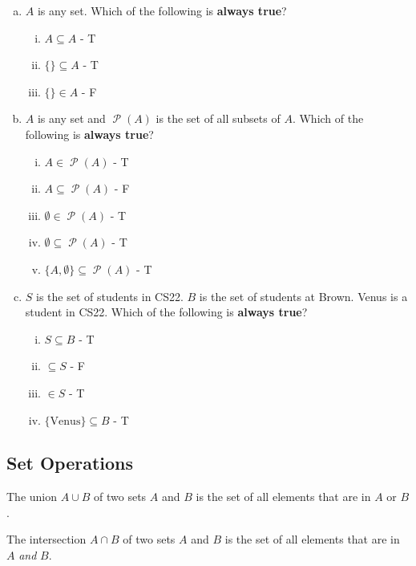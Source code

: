 \documentclass[12pt,letterpaper]{article}
\newcommand\Pow{\ensuremath{\operatorname{\mathcal{P}}}}
\begin{document}
    \begin{mdframed}
        \begin{enumerate}[a.]
        \item $A$ is any set. Which of the following is \textbf{always true}?
          \begin{enumerate}[i.]
            \item $A \subseteq A$ - T
            \item $\{\} \subseteq A$ - T
            \item $\{\} \in A$ - F
		 \end{enumerate}
	  \item $A$ is any set and $\Pow{(A)}$ is the set of all subsets of $A$. Which of the following is \textbf{always true}?
		\begin{enumerate}[i.]
		   \item $A \in \Pow{(A)}$ - T
		   \item $A \subseteq \Pow{(A)}$ - F  
		   \item $\emptyset \in \Pow{(A)}$ - T
		   \item $\emptyset \subseteq \Pow{(A)}$ - T  
		   \item $\{A, \emptyset\} \subseteq \Pow{(A)}$ - T
          \end{enumerate}
        \item $S$ is the set of students in CS22. $B$ is the set of students at Brown. Venus is a student in CS22. Which of the following is \textbf{always true}?
        \begin{enumerate}[i.]
          \item $S \subseteq B$ - T
          \item {} $\subseteq S$ - F  
          \item {} $\in S$ - T
          \item $\{\text{Venus}\} \subseteq B$ - T
        \end{enumerate}
      \end{enumerate}
          
    \end{mdframed}

        
    \subsection{Set Operations}
    The union $A \cup B$ of two sets $A$ and $B$ is the set of all elements that are in $A$ or $B$.
    
    The intersection $A \cap B$ of two sets $A$ and $B$ is the set of all elements that are in $A$ \emph{and} $B$.
    
\end{document}
